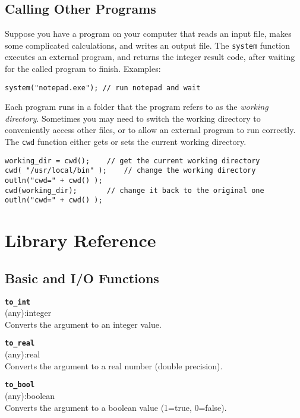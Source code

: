 \documentclass{article}
\begin{document}
\subsection{Calling Other Programs}

Suppose you have a program on your computer that reads an input file, makes some complicated calculations, and writes an output file.  The \texttt{system} function executes an external program, and returns the integer result code, after waiting for the called program to finish.  Examples:

\begin{verbatim}
system("notepad.exe"); // run notepad and wait
\end{verbatim}

Each program runs in a folder that the program refers to as the \emph{working directory}.  Sometimes you may need to switch the working directory to conveniently access other files, or to allow an external program to run correctly.  The \texttt{cwd} function either gets or sets the current working directory.

\begin{verbatim}
working_dir = cwd();    // get the current working directory
cwd( "/usr/local/bin" );    // change the working directory
outln("cwd=" + cwd() );
cwd(working_dir);       // change it back to the original one
outln("cwd=" + cwd() );
\end{verbatim}


\section{Library Reference}
\subsection{Basic and I/O Functions}
{\large \texttt{\textbf{to\_int}}}\\
\textsf{ (any):integer }\\
Converts the argument to an integer value.

{\large \texttt{\textbf{to\_real}}}\\
\textsf{ (any):real }\\
Converts the argument to a real number (double precision).

{\large \texttt{\textbf{to\_bool}}}\\
\textsf{ (any):boolean }\\
Converts the argument to a boolean value (1=true, 0=false).
\end{document}
